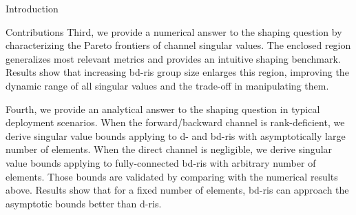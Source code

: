 \begin{section}{Introduction}
\begin{subsection}{Contributions}
		Third, we provide a numerical answer to the shaping question by characterizing the Pareto frontiers of channel singular values.
		The enclosed region generalizes most relevant metrics and provides an intuitive shaping benchmark.
		Results show that increasing \gls{bd}-\gls{ris} group size enlarges this region, improving the dynamic range of all singular values and the trade-off in manipulating them.



		Fourth, we provide an analytical answer to the shaping question in typical deployment scenarios.
		When the forward/backward channel is rank-deficient, we derive singular value bounds applying to \gls{d}- and \gls{bd}-\gls{ris} with asymptotically large number of elements.
		When the direct channel is negligible, we derive singular value bounds applying to fully-connected \gls{bd}-\gls{ris} with arbitrary number of elements.
		Those bounds are validated by comparing with the numerical results above.
		Results show that for a fixed number of elements, \gls{bd}-\gls{ris} can approach the asymptotic bounds better than \gls{d}-\gls{ris}.


\end{subsection}
\end{section}
